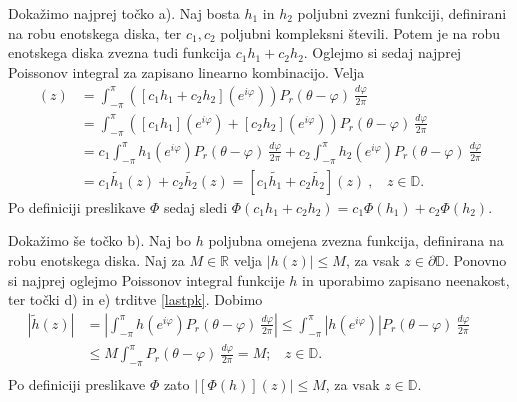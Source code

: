 \documentclass[mat1, tisk]{fmfdelo}
\begin{document}
     \begin{dokaz}
            Dokažimo najprej točko a). Naj bosta $h_1$ in $h_2$ poljubni zvezni funkciji, definirani na robu enotskega diska, ter $c_1, c_2$ poljubni kompleksni števili. 
            Potem je na robu enotskega diska zvezna tudi funkcija $c_1 h_1 + c_2 h_2$. Oglejmo si sedaj najprej Poissonov integral za zapisano linearno kombinacijo. Velja
            \begin{align*}
                [\widetilde{c_1 h_1 + c_2 h_2}](z) &= \int_{-\pi}^{\pi}{\left([c_1 h_1 + c_2 h_2](e^{i\varphi}) \right)P_r(\theta - \varphi)~\frac{d\varphi}{2 \pi}}\\ 
                & = \int_{-\pi}^{\pi}{\left([c_1 h_1](e^{i\varphi}) + [c_2 h_2](e^{i\varphi})\right)P_r(\theta - \varphi)~\frac{d\varphi}{2 \pi}}\\
                & = c_1\int_{-\pi}^{\pi}{h_1(e^{i\varphi})P_r(\theta - \varphi)~\frac{d\varphi}{2 \pi}} + c_2\int_{-\pi}^{\pi}{h_2(e^{i\varphi})P_r(\theta - \varphi)~\frac{d\varphi}{2 \pi}}\\
                & = c_1 \widetilde{h_1}(z) + c_2 \widetilde{h_2}(z) = [c_1 \widetilde{h_1} + c_2 \widetilde{h_2}](z)~,~~~~z \in \mathbb{D}.
            \end{align*}
            Po definiciji preslikave $\Phi$ sedaj sledi $\Phi(c_1 h_1 + c_2 h_2) = c_1 \Phi(h_1) + c_2 \Phi(h_2)$.

            Dokažimo še točko b). Naj bo $h$ poljubna omejena zvezna funkcija, definirana na robu enotskega diska. Naj za $M \in \mathbb{R}$ velja $|h(z)| \leq M$, za vsak $z \in \partial \mathbb{D}$.
            Ponovno si najprej oglejmo Poissonov integral funkcije $h$ in uporabimo zapisano neenakost, ter točki d) in e) trditve \ref{lastpk}. Dobimo
            \begin{align*}
                \left|\widetilde{h}(z)\right| &= \left| \int_{-\pi}^{\pi}{h(e^{i\varphi}) P_r(\theta - \varphi)~\frac{d\varphi}{2 \pi}} \right| \leq \int_{-\pi}^{\pi}{\left|h(e^{i\varphi}) \right|P_r(\theta - \varphi)~\frac{d\varphi}{2 \pi}} \\ 
                &\leq M \int_{-\pi}^{\pi}{P_r(\theta - \varphi)~\frac{d\varphi}{2 \pi}} = M;~~~~z \in \mathbb{D}.& & \\
            \end{align*}
            Po definiciji preslikave $\Phi$ zato $|[\Phi(h)](z)| \leq M$, za vsak $z \in \mathbb{D}$.
     \end{dokaz}
\end{document}
